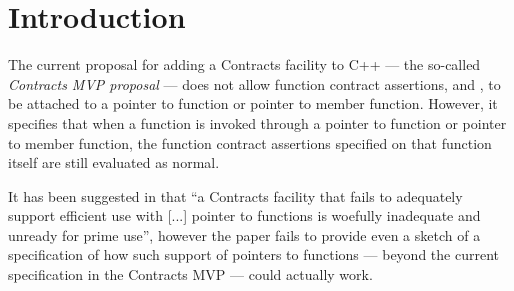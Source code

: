 





\section{Introduction}
\label{sec:intro}

The current proposal \cite{P2900R7} for adding a Contracts facility to C++ --- the so-called \emph{Contracts MVP proposal} --- does not allow function contract assertions,  and , to be attached to a pointer to function or pointer to member function. However, it specifies that when a function is invoked through a pointer to function or pointer to member function, the function contract assertions specified on that function itself are still evaluated as normal.

It has been suggested in \cite{P3173R0} that ``a Contracts facility that fails to adequately support efficient use with [...] pointer to functions is woefully inadequate and unready for prime use'', however the paper fails to provide even a sketch of a specification of how such support of pointers to functions --- beyond the current specification in the Contracts MVP --- could actually work.

